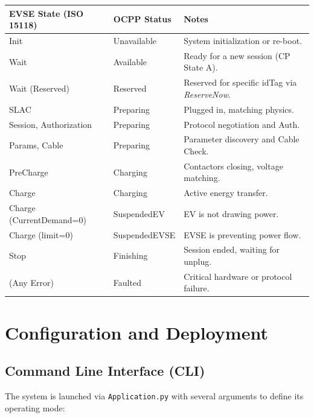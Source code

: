 \documentclass[a4paper,11pt]{report}
\begin{document}
\begin{center}
\begin{tabular}{|l|l|p{6cm}|}
\hline
\textbf{EVSE State (ISO 15118)} & \textbf{OCPP Status} & \textbf{Notes} \\
\hline
Init & Unavailable & System initialization or re-boot. \\
\hline
Wait & Available & Ready for a new session (CP State A). \\
\hline
Wait (Reserved) & Reserved & Reserved for specific idTag via \textit{ReserveNow}. \\
\hline
SLAC & Preparing & Plugged in, matching physics. \\
\hline
Session, Authorization & Preparing & Protocol negotiation and Auth. \\
\hline
Params, Cable & Preparing & Parameter discovery and Cable Check. \\
\hline
PreCharge & Charging & Contactors closing, voltage matching. \\
\hline
Charge & Charging & Active energy transfer. \\
\hline
Charge (CurrentDemand=0) & SuspendedEV & EV is not drawing power. \\
\hline
Charge (limit=0) & SuspendedEVSE & EVSE is preventing power flow. \\
\hline
Stop & Finishing & Session ended, waiting for unplug. \\
\hline
(Any Error) & Faulted & Critical hardware or protocol failure. \\
\hline
\end{tabular}
\end{center}

\chapter{Configuration and Deployment}

\section{Command Line Interface (CLI)}
The system is launched via \texttt{Application.py} with several arguments to define its operating mode:
\end{document}
